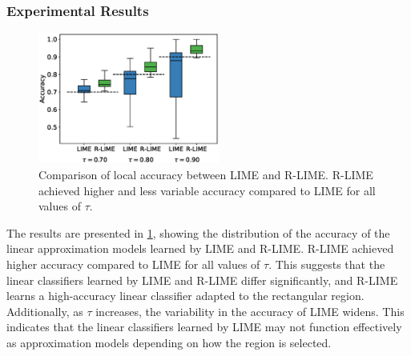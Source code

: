 \documentclass[11pt]{article}
\begin{document}
\subsubsection{Experimental Results}
\begin{figure}[tbp]
	\centering
	\includegraphics[width=0.53\textwidth]{experiments/exp2/box_plot}
	\caption[Comparison of Local Accuracy between R-LIME and LIME]{%
		Comparison of local accuracy between LIME and R-LIME\@.
		R-LIME achieved higher and less variable accuracy compared to LIME
		for all values of $\tau$.
	}\label{fig:box_plot}
\end{figure}
The results are presented in \cref{fig:box_plot},
showing the distribution of the accuracy of the linear approximation models
learned by LIME and R-LIME\@.
R-LIME achieved higher accuracy compared to LIME for all values of $\tau$.
This suggests that the linear classifiers learned by LIME and R-LIME
differ significantly,
and R-LIME learns a high-accuracy linear classifier adapted to the rectangular region.
Additionally, as $\tau$ increases,
the variability in the accuracy of LIME widens.
This indicates that the linear classifiers learned by LIME may not function
effectively as approximation models depending on how the region is selected.
\end{document}
